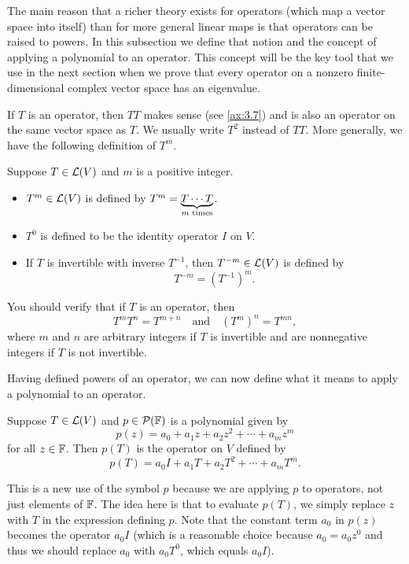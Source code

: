 The main reason that a richer theory exists for operators (which map a vector
space into itself) than for more general linear maps is that operators can be
raised to powers. In this subsection we define that notion and the concept of
applying a polynomial to an operator. This concept will be the key tool that
we use in the next section when we prove that every operator on a nonzero
finite-dimensional complex vector space has an eigenvalue.

If $T$ is an operator, then $TT$ makes sense (see \ref{ax:3.7}) and is also an
operator on the same vector space as $T$. We usually write $T^2$ instead of
$TT$. More generally, we have the following definition of $T^m$.

\begin{notation}[$T^m$]\label{ax:5.13}
Suppose $T\in\mathcal{L}(V)$ and $m$ is a positive integer.
\begin{itemize}
\item $T^m\in\mathcal{L}(V)$ is defined by $T^m=\underbrace{T\cdots T}_{m\text{ times}}$.
\item $T^0$ is defined to be the identity operator $I$ on $V$.
\item If $T$ is invertible with inverse $T^{-1}$, then $T^{-m}\in\mathcal{L}(V)$ is
  defined by
  \[ T^{-m} = (T^{-1})^m. \]
\end{itemize}
\end{notation}

You should verify that if $T$ is an operator, then
\[ T^mT^n = T^{m+n} \quad\text{and}\quad (T^m)^n = T^{mn}, \]
where $m$ and $n$ are arbitrary integers if $T$ is invertible and are
nonnegative integers if $T$ is not invertible.

Having defined powers of an operator, we can now define what it means to apply
a polynomial to an operator.

\begin{notation}[$p(T)$]\label{ax:5.14}
Suppose $T\in\mathcal{L}(V)$ and $p\in\mathcal{P}(\mathbb{F})$ is a polynomial given by
\[ p(z) = a_0+a_1z+a_2z^2+\cdots+a_mz^m \]
for all $z\in\mathbb{F}$. Then $p(T)$ is the operator on $V$ defined by
\[ p(T) = a_0I+a_1T+a_2T^2+\cdots+a_mT^m. \]
\end{notation}

This is a new use of the symbol $p$ because we are applying $p$ to operators,
not just elements of $\mathbb{F}$. The idea here is that to evaluate $p(T)$, we simply
replace $z$ with $T$ in the expression defining $p$. Note that the constant
term $a_0$ in $p(z)$ becomes the operator $a_0I$ (which is a reasonable choice
because $a_0=a_0z^0$ and thus we should replace $a_0$ with $a_0T^0$, which
equals $a_0I$).

